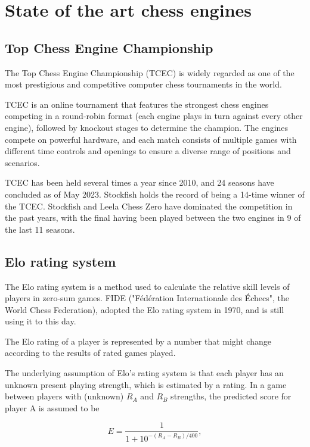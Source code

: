 \chapter{State of the art chess engines}
\label{chap:ch3}

\section{Top Chess Engine Championship}
\label{sec:ch3sec1}

The Top Chess Engine Championship (TCEC) is widely regarded as one of the most prestigious and competitive computer chess tournaments in the world.

TCEC is an online tournament that features the strongest chess engines competing in a round-robin format (each engine plays in turn against every other engine), followed by knockout stages to determine the champion. The engines compete on powerful hardware, and each match consists of multiple games with different time controls and openings to ensure a diverse range of positions and scenarios.

TCEC has been held several times a year since 2010, and 24 seasons have concluded as of May 2023. Stockfish holds the record of being a 14-time winner of the TCEC. Stockfish and Leela Chess Zero have dominated the competition in the past years, with the final having been played between the two engines in 9 of the last 11 seasons.

\section{Elo rating system}
\label{sec:ch3sec2}

The Elo rating system is a method used to calculate the relative skill levels of players in zero-sum games. FIDE ("Fédération Internationale des Échecs", the World Chess Federation), adopted the Elo rating system in 1970, and is still using it to this day.

The Elo rating of a player is represented by a number that might change according to the results of rated games played.

The underlying assumption of Elo's rating system is that each player has an unknown present playing strength, which is estimated by a rating. In a game between players with (unknown) $R_A$ and $R_B$ strengths, the predicted score for player A is assumed to be

\[E=\frac{1}{1+10^{-(R_A-R_B)/400}},\]

